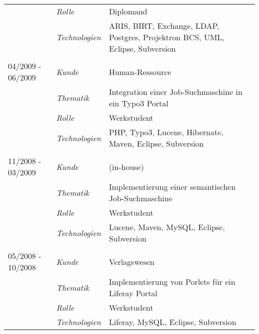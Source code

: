 \begin{longtable}{@{}>{}p{4cm}>{\itshape}p{2cm}>{}p{9cm}}
\nopagebreak		& Rolle 	    & Diplomand\\
\nopagebreak		& Technologien	& ARIS, BIRT, Exchange, LDAP, Postgres, Projektron BCS, UML, Eclipse, Subversion\\
\\
04/2009 - 06/2009	& Kunde 	    & Human-Ressource\\
\nopagebreak		& Thematik	    & Integration einer Job-Suchmaschine in ein Typo3 Portal\\
\nopagebreak		& Rolle 	    & Werkstudent\\
\nopagebreak		& Technologien	& PHP, Typo3, Lucene, Hibernate, Maven, Eclipse, Subversion\\
\\
11/2008 - 03/2009	& Kunde 	& (in-house)\\
\nopagebreak		& Thematik	& Implementierung einer semantischen Job-Suchmaschine\\
\nopagebreak		& Rolle 	& Werkstudent\\
\nopagebreak		& Technologien	& Lucene, Maven, MySQL, Eclipse, Subversion\\
\\
05/2008 - 10/2008	& Kunde 	& Verlagswesen\\
\nopagebreak		& Thematik	& Implementierung von Porlets für ein Liferay Portal\\
\nopagebreak		& Rolle 	& Werkstudent\\
\nopagebreak		& Technologien	& Liferay, MySQL, Eclipse, Subversion\\
\end{longtable}
\renewcommand{\arraystretch}{2}


